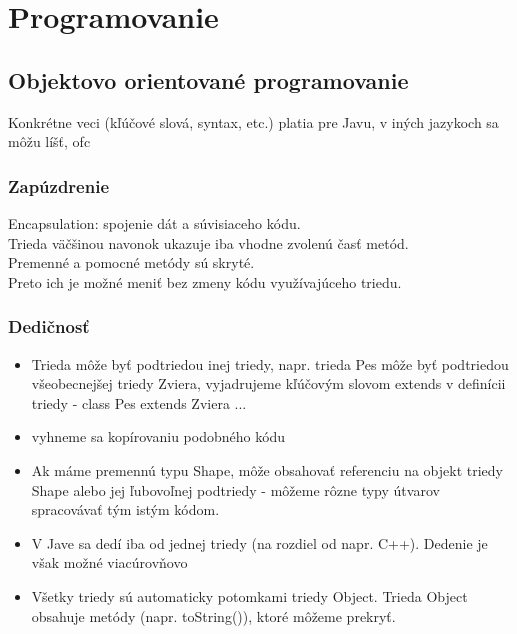 \chapter[Programovanie]{Programovanie}
\label{programovanie} %


\section{Objektovo orientované programovanie}


	Konkrétne veci (kľúčové slová, syntax, etc.) platia pre Javu, v iných jazykoch sa môžu líšť, ofc
	\subsection{Zapúzdrenie}
	Encapsulation: spojenie dát a súvisiaceho kódu.\\
	Trieda väčšinou navonok ukazuje iba vhodne zvolenú časť metód.\\
	Premenné a pomocné metódy sú skryté.\\
	Preto ich je možné meniť bez zmeny kódu využívajúceho triedu.\\
	
	\subsection{Dedičnosť}
		\begin{itemize}
			\item Trieda môže byť podtriedou inej triedy, napr. trieda Pes môže byť podtriedou všeobecnejšej triedy Zviera, vyjadrujeme kľúčovým slovom extends v definícii triedy - class Pes extends Zviera { ... }
			\item vyhneme sa kopírovaniu podobného kódu
			\item Ak máme premennú typu Shape, môže obsahovať referenciu na objekt triedy Shape alebo jej ľubovoľnej podtriedy - môžeme rôzne typy útvarov spracovávať tým istým kódom.

			\item V Jave sa dedí iba od jednej triedy (na rozdiel od napr. C++). Dedenie je však možné viacúrovňovo
			
			\item Všetky triedy sú automaticky potomkami triedy Object. Trieda Object obsahuje metódy (napr. toString()), ktoré môžeme prekryť.
		\end{itemize}

